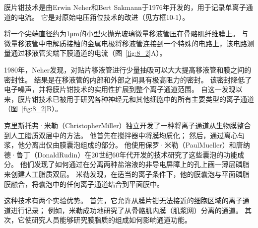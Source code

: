 \begin{proposition} \label{box:8_1}
	
	\quad \quad 膜片钳技术是由Erwin Neher和Bert Sakmann于1976年开发的，用于记录单离子通道的电流。
	它是对原始电压箝位技术的改进（见方框10-1）。
	
	\quad \quad 将一个尖端直径约为1μm的小型火抛光玻璃微量移液管压在骨骼肌纤维膜上。
	与微量移液管中电解质接触的金属电极将移液管连接到一个特殊的电路上，该电路测量通过移液管尖端下膜通道的电流（图~\ref{fig:8_2}A）。
	
	\quad \quad 1980年，Neher发现，对贴片移液管进行少量抽吸可以大大提高移液管和膜之间的密封性。
	结果是在移液管的内部和外部之间具有极高阻力的密封。
	该密封降低了电子噪声，并将膜片钳技术的实用性扩展到整个离子通道范围。
	自这一发现以来，膜片钳技术已被用于研究各种神经元和其他细胞中的所有主要类型的离子通道（图~\ref{fig:8_2}B）。
	
	\quad \quad 克里斯托弗·米勒（ChristopherMiller）独立开发了一种将离子通道从生物膜整合到人工脂质双层中的方法。
	他首先在搅拌器中将膜均质化；
	然后，通过离心匀浆，他分离出仅由膜囊泡组成的部分。
	他使用保罗·米勒（PaulMueller）和唐纳德·鲁丁（DonaldRudin）在20世纪60年代开发的技术研究了这些囊泡的功能成分。
	他们发现了如何通过在分离两种盐溶液的非导电屏障上的孔上画一薄层磷脂来创建人工脂质双层。
	米勒发现，在适当的离子条件下，他的膜囊泡与平面磷脂膜融合，将囊泡中的任何离子通道结合到平面膜中。
	
	\quad \quad 这种技术有两个实验优势。
	首先，它允许从膜片钳无法接近的细胞区域的离子通道进行记录；
	例如，米勒成功地研究了从骨骼肌内膜（肌浆网）分离的通道。
	其次，它使研究人员能够研究膜脂质的组成如何影响通道功能。
	
\end{proposition}


